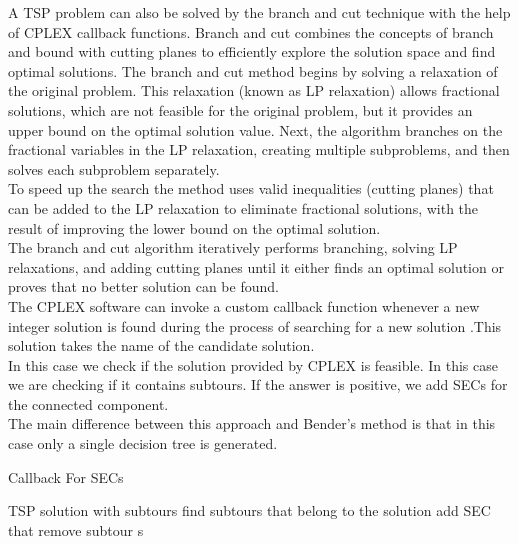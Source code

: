 A TSP problem can also be solved by the branch and cut technique with the help of CPLEX callback functions. Branch and cut combines the concepts of branch and bound with cutting planes to efficiently explore the solution space and find optimal solutions. The branch and cut method begins by solving a relaxation of the original problem. This relaxation (known as LP relaxation) allows fractional solutions, which are not feasible for the original problem, but it provides an upper bound on the optimal solution value.
Next, the algorithm branches on the fractional variables in the LP relaxation, creating multiple subproblems, and then solves each subproblem separately.\\
To speed up the search the method uses valid inequalities (cutting planes) that can be added to the LP relaxation to eliminate fractional solutions, with the result of improving the lower bound on the optimal solution. \\
The branch and cut algorithm iteratively performs branching, solving LP relaxations, and adding cutting planes until it either finds an optimal solution or proves that no better solution can be found. \\
The CPLEX software can invoke a custom callback function whenever a new integer solution is found during the process of searching for a new solution .This solution takes the name of the candidate solution.\\
In this case we check if the solution provided by CPLEX is feasible. In this case we are checking if it contains subtours. If the answer is positive, we add SECs for the connected component. \\
The main difference between this approach and Bender’s method is that in this case only a single decision tree is generated.

\begin{algorithm}
    \caption{Callback For SECs}\label{algo:SECcallback}
    \begin{algorithmic}[1]
    \Require TSP solution with subtours
    \State find subtours that belong to the solution
    \State add SEC that remove subtour s
    \EndFor
    
    \end{algorithmic}
\end{algorithm}


